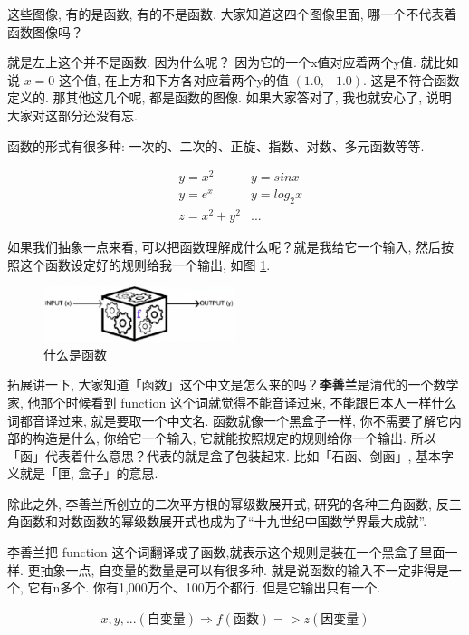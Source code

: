 这些图像, 有的是函数, 有的不是函数. 大家知道这四个图像里面, 哪一个不代表着函数图像吗？

就是左上这个并不是函数. 因为什么呢？ 因为它的一个x值对应着两个y值. 就比如说 $x=0$ 这个值, 在上方和下方各对应着两个y的值 $(1.0, -1.0)$. 这是不符合函数定义的. 那其他这几个呢, 都是函数的图像. 如果大家答对了, 我也就安心了, 说明大家对这部分还没有忘. 

函数的形式有很多种: 一次的、二次的、正旋、指数、对数、多元函数等等. 

\begin{align*}
    & y=x^2 & y=sinx \\
    & y=e^x & y={log_2}x \\
    & z=x^2+y^2 & ...
\end{align*}

如果我们抽象一点来看, 可以把函数理解成什么呢？就是我给它一个输入, 然后按照这个函数设定好的规则给我一个输出, 如图 \ref{fig:img3_2}. 

\begin{figure}[ht]
  \centering
  \includegraphics[width=0.5\textwidth]{asset/9f20645c-ef49-4ffd-9178-d01b67c74249.png}
  \caption{什么是函数}
  \label{fig:img3_2}
\end{figure}

拓展讲一下, 大家知道「函数」这个中文是怎么来的吗？\textbf{李善兰}是清代的一个数学家, 他那个时候看到 function 这个词就觉得不能音译过来, 不能跟日本人一样什么词都音译过来, 就是要取一个中文名. 函数就像一个黑盒子一样, 你不需要了解它内部的构造是什么, 你给它一个输入, 它就能按照规定的规则给你一个输出. 所以「函」代表着什么意思？代表的就是盒子包装起来. 比如「石函、剑函」, 基本字义就是「匣, 盒子」的意思. 

除此之外, 李善兰所创立的二次平方根的幂级数展开式, 研究的各种三角函数, 反三角函数和对数函数的幂级数展开式也成为了“十九世纪中国数学界最大成就”. 

李善兰把 function 这个词翻译成了函数,就表示这个规则是装在一个黑盒子里面一样. 更抽象一点, 自变量的数量是可以有很多种. 就是说函数的输入不一定非得是一个, 它有n多个. 你有1,000万个、100万个都行. 但是它输出只有一个. 

\begin{align*}
    x,y,...(\mbox{自变量}) \Rightarrow f(\mbox{函数}) => z(\mbox{因变量})
\end{align*}

